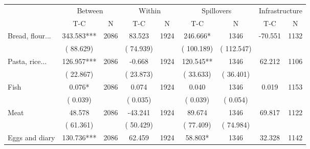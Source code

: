 
\begin{tabular}{l*{8}{c}}\hline&\multicolumn{2}{c}{Between}&\multicolumn{2}{c}{Within}&\multicolumn{2}{c}{Spillovers}&\multicolumn{2}{c}{Infrastructure}\\ \cmidrule(r){2-3}\cmidrule(l){4-5}\cmidrule(l){6-7}\cmidrule(l){8-9} & {T-C} & {N} & {T-C} & {N}  & {T-C}  & {N} & {T-C}  & {N} \\ \midrule
Bread, flour...        &            343.583***      &       2086       &             83.523      &       1924       &            246.666*      &       1346  &      -70.551 &       1132       \\
                       &       (      88.629)            &                               &       (      74.939)            &                               &       (     100.189)            &       (     112.547) &                  \\
Pasta, rice...        &            126.957***      &       2086       &             -0.668      &       1924       &            120.545**      &       1346  &       62.212 &       1106       \\
                       &       (      22.867)            &                               &       (      23.873)            &                               &       (      33.633)            &       (      36.401) &                  \\
Fish        &              0.076*      &       2086       &              0.074      &       1924       &              0.040      &       1346  &        0.019 &       1153       \\
                       &       (       0.039)            &                               &       (       0.035)            &                               &       (       0.039)            &       (       0.054) &                  \\
Meat        &             48.578      &       2086       &            -43.241      &       1924       &             89.674      &       1346  &       69.817 &       1122       \\
                       &       (      61.361)            &                               &       (      50.429)            &                               &       (      77.409)            &       (      74.984) &                  \\
Eggs and diary        &            130.736***      &       2086       &             62.459      &       1924       &             58.803*      &       1346  &       32.328 &       1142       \\

\end{tabular}
